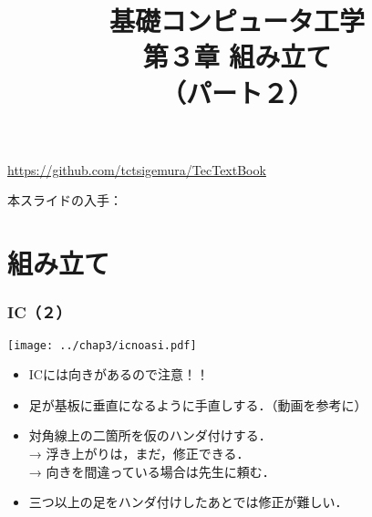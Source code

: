 \documentclass{beamer}                 %
\begin{document}
\title{基礎コンピュータ工学\\第３章 組み立て\\（パート２）}
\date{}

\begin{frame}
  \titlepage
  \centerline{\url{https://github.com/tctsigemura/TecTextBook}}
  \vfill
  \centerline{本スライドの入手：
    }
\end{frame}


\section{組み立て}

\begin{frame}
  \frametitle{IC（２）}
  \vfill
  \centerline{\texttt{[image: ../chap3/icnoasi.pdf]}}
  \vfill
  \begin{itemize}
  \item ICには向きがあるので注意！！
  \item 足が基板に垂直になるように手直しする．（動画を参考に）
  \item 対角線上の二箇所を仮のハンダ付けする．\\
    → 浮き上がりは，まだ，修正できる．\\
    → 向きを間違っている場合は先生に頼む．
  \item 三つ以上の足をハンダ付けしたあとでは修正が難しい．
  \end{itemize}
\end{frame}
\end{document}

